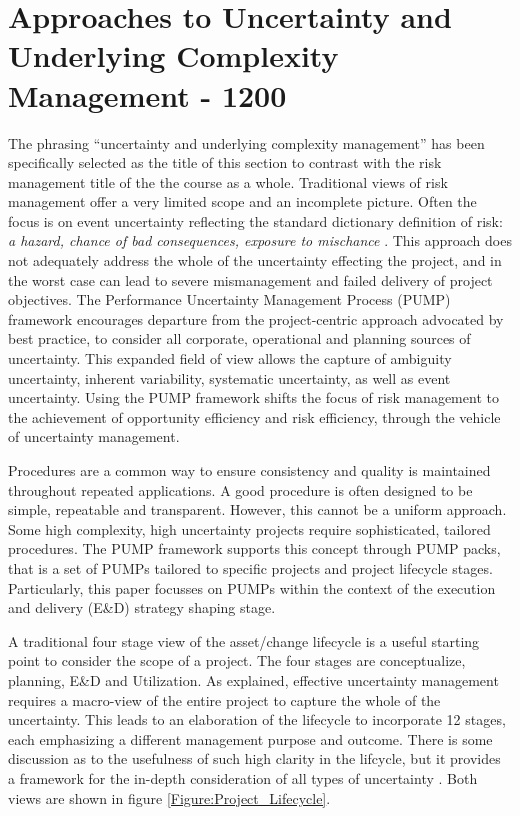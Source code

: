 
\section{Approaches to Uncertainty and Underlying Complexity Management - 1200}


The phrasing ``uncertainty and underlying complexity management'' has been specifically selected as the title of this section to contrast with the risk management title of the the course as a whole.
Traditional views of risk management offer a very limited scope and an incomplete picture.
Often the focus is on event uncertainty reflecting the standard dictionary definition of risk: \textit{a hazard, chance of bad consequences, exposure to mischance} \citep{OED}.
This approach does not adequately address the whole of the uncertainty effecting the project, and in the worst case can lead to severe mismanagement and failed delivery of project objectives.
The Performance Uncertainty Management Process (PUMP) framework encourages departure from the project-centric approach advocated by best practice, to consider all corporate, operational and planning sources of uncertainty.
This expanded field of view allows the capture of ambiguity uncertainty, inherent variability, systematic uncertainty, as well as event uncertainty.
Using the PUMP framework shifts the focus of risk management to the achievement of opportunity efficiency and risk efficiency, through the vehicle of uncertainty management.

Procedures are a common way to ensure consistency and quality is maintained throughout repeated applications.
A good procedure is often designed to be simple, repeatable and transparent.
However, this cannot be a uniform approach.
Some high complexity, high uncertainty projects require sophisticated, tailored procedures.
The PUMP framework supports this concept through PUMP packs, that is a set of PUMPs tailored to specific projects and project lifecycle stages.
Particularly, this paper focusses on PUMPs within the context of the execution and delivery (E\&D) strategy shaping stage.

A traditional four stage view of the asset/change lifecycle is a useful starting point to consider the scope of a project.
The four stages are conceptualize, planning, E\&D and Utilization.
As explained, effective uncertainty management requires a macro-view of the entire project to capture the whole of the uncertainty.
This leads to an elaboration of the lifecycle to incorporate 12 stages, each emphasizing a different management purpose and outcome.
There is some discussion as to the usefulness of such high clarity in the lifcycle, but it provides a framework for the in-depth consideration of all types of uncertainty \citep{Ward1995145}.
Both views are shown in figure \ref{Figure:Project_Lifecycle}.

